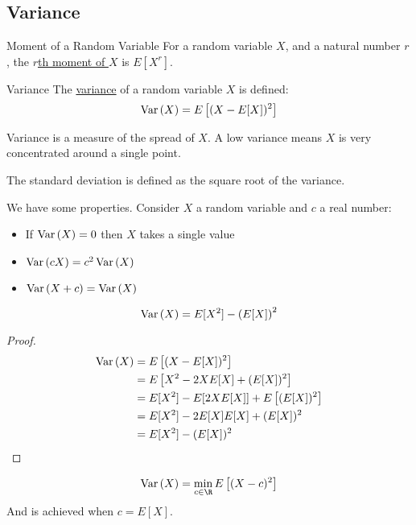 \documentclass[../Main.tex]{subfiles}
\begin{document}
\subsection{Variance}
\begin{definition}{Moment of a Random Variable}
    For a random variable $X$, and a natural number $r$, the \underline{$r$th moment of $X$} is $E[X^r]$.
\end{definition}
\begin{definition}{Variance}
    The \underline{variance} of a random variable $X$ is defined:
    \begin{equation*}
        \operatorname{Var}{(X)} = E\left[(X - E[X])^2\right]
    \end{equation*}
\end{definition}
Variance is a measure of the spread of $X$. A low variance means $X$ is very concentrated around a single point.\par
The standard deviation is defined as the square root of the variance.\par
We have some properties. Consider $X$ a random variable and $c$ a real number:
\begin{itemize}
    \item If $\operatorname{Var}{(X)} = 0$ then $X$ takes a single value
    \item $\operatorname{Var}{(cX)} = c^2 \operatorname{Var}{(X)}$
    \item $\operatorname{Var}{(X + c)} = \operatorname{Var}{(X)}$
\end{itemize}
\begin{proposition}
    \begin{equation}
        \operatorname{Var}{(X)} = E[X^2] - \left(E[X]\right)^2
        \label{eqnAlternateVariance}
    \end{equation}
\end{proposition}
\begin{proof}
    \begin{align*}
        \operatorname{Var}{(X)} &= E\left[(X - E[X])^2\right] \\
        &= E\left[X^2 - 2XE[X] + (E[X])^2\right] \\
        &= E[X^2] - E[2XE[X]] + E\left[(E[X])^2\right] \\
        &= E[X^2] - 2E[X]E[X] + (E[X])^2 \\
        &= E[X^2] - (E[X])^2
    \end{align*}
\end{proof}
\begin{lemma}
    \begin{equation*}
        \Var{(X)} = \min_{c \in \R} E\left[(X - c)^2\right]
    \end{equation*}
    And is achieved when $c = E[X]$.
\end{lemma}
\end{document}
